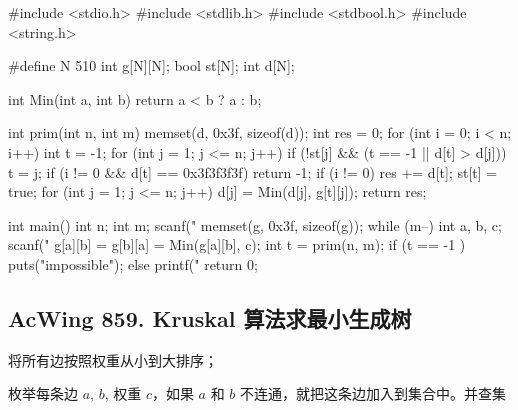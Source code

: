 \begin{mycpptwocol}[Prim 算法]
    #include <stdio.h>
    #include <stdlib.h>
    #include <stdbool.h>
    #include <string.h>

    #define N 510
    int g[N][N];
    bool st[N];
    int d[N];

    int Min(int a, int b) {
        return a < b ? a : b;
    }

    int prim(int n, int m) {
        memset(d, 0x3f, sizeof(d));
        int res = 0;
        for (int i = 0; i < n; i++) {
            int t = -1;
            for (int j = 1; j <= n; j++) {
                if (!st[j] && (t == -1 || d[t] > d[j])) {
                    t = j;
                }
            }
            if (i != 0 && d[t] == 0x3f3f3f3f) {
                return -1;
            }
            if (i != 0) {
                res += d[t];
            }
            st[t] = true;
            for (int j = 1; j <= n; j++) {
                d[j] = Min(d[j], g[t][j]);
            }
        }
        return res;
    }

    int main() {
        int n;
        int m;
        scanf("%
        memset(g, 0x3f, sizeof(g));
        while (m--) {
            int a, b, c;
            scanf("%
            g[a][b] = g[b][a] = Min(g[a][b], c);
        }
        int t = prim(n, m);
        if (t == -1 ) {
            puts("impossible");
        } else {
            printf("%
        }
        return 0;
    }
\end{mycpptwocol}

\subsection{AcWing 859. Kruskal 算法求最小生成树}

\begin{myenum}
    \item 将所有边按照权重从小到大排序；
    \item 枚举每条边 $a$, $b$, 权重 $c$，如果 $a$ 和 $b$ 不连通，就把这条边加入到集合中。并查集
\end{myenum}

